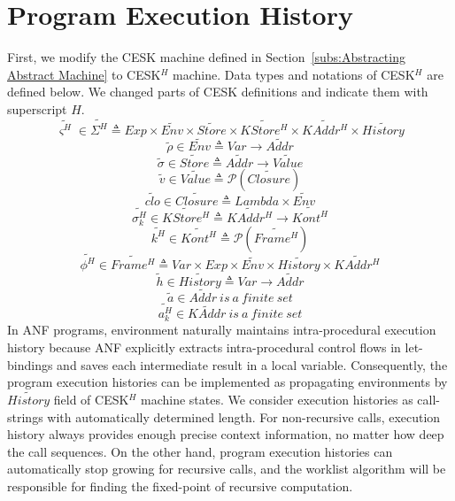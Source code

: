 \documentclass[12pt]{report}
\begin{document}
\section{Program Execution History}
\label{sub:Program Execution History}
First, we modify the CESK machine defined in Section~\ref{subs:Abstracting Abstract Machine} to CESK$^H$ machine.
Data types and notations of CESK$^H$ are defined below. We changed parts of CESK definitions and indicate them with superscript $H$.
\[
\tag{states}
\widetilde{\varsigma^H}\in\widetilde{\Sigma^H} \triangleq Exp \times \widetilde{Env} \times \widetilde{Store}
\times \widetilde{KStore^H} \times \widetilde{KAddr^H} \times \widetilde{History}
\]
\[
\tag{environments}
\tilde{\rho} \in \widetilde{Env} \triangleq Var \to \widetilde{Addr}
\]
\[
\tag{stores}
\tilde{\sigma} \in \widetilde{Store} \triangleq \widetilde{Addr} \to \widetilde{Value}
\]
\[
\tag{abstract values}
\tilde{v} \in \widetilde{Value} \triangleq \mathcal{P}(\widetilde{Closure})
\]
\[
\tag{closures}
\widetilde{clo} \in \widetilde{Closure} \triangleq Lambda \times \widetilde{Env}
\]
\[
\tag{continuation stores}
\widetilde{\sigma_k^H} \in \widetilde{KStore^H} \triangleq  \widetilde{KAddr^H} \to  \widetilde{Kont^H}
\]
\[
\tag{abstract continuations}
\widetilde{k^H} \in  \widetilde{Kont^H} \triangleq  \mathcal{P}(\widetilde{Frame^H})
\]
\[
\tag{stack frames}
\widetilde{\phi^H} \in  \widetilde{Frame^H} \triangleq Var \times Exp \times  \widetilde{Env} \times \widetilde{History} \times  \widetilde{KAddr^H}
\]
\[
\tag{histories}
\tilde{h} \in \widetilde{History} \triangleq Var \to \widetilde{Addr}
\]
\[
\tag{value addresses}
\tilde{a} \in \widetilde{Addr} \ is\ a\ finite\ set
\]
\[
\tag{continuation addresses}
\widetilde{a_k^H} \in \widetilde{KAddr} \ is\ a\ finite\ set
\]
In ANF programs, environment naturally maintains intra-procedural execution history because ANF explicitly extracts intra-procedural control flows in let-bindings and saves each intermediate result in a local variable.
Consequently, the program execution histories can be implemented as propagating environments by $\widetilde{History}$ field of CESK$^H$ machine states.
We consider execution histories as call-strings with automatically determined length. For non-recursive calls, execution history always provides enough precise context information, no matter how deep the call sequences. On the other hand, program execution histories can automatically stop growing for recursive calls, and the worklist algorithm will be responsible for finding the fixed-point of recursive computation.
\end{document}
